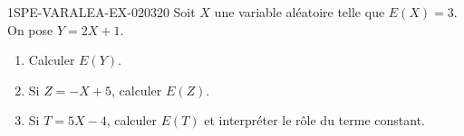 \begin{exercice}{1SPE-VARALEA-EX-020}{3}{20}
Soit $X$ une variable aléatoire telle que $E(X) = 3$. On pose $Y = 2X + 1$.

\begin{enumerate}
  \item Calculer $E(Y)$.
  \item Si $Z = -X + 5$, calculer $E(Z)$.
  \item Si $T=5X-4$, calculer $E(T)$ et interpréter le rôle du terme constant.
\end{enumerate}
\end{exercice}
